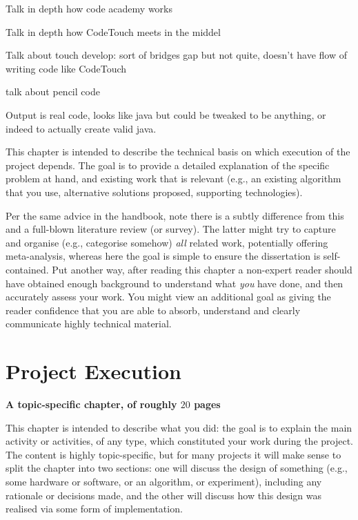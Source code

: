 \documentclass[ %
                    author={Jonathan Rankin},
                supervisor={Dr. David May, Dr. Ian Holyer},
                    degree={MEng},
                     title={CodeTouch},
                  subtitle={A Revolutionary Way To Program Real Code On Touch Screen Devices},
                      type={enterprise},
                      year={2015 } ]{dissertation}
\begin{document}
Talk in depth how code academy works

Talk in depth how CodeTouch meets in the middel

Talk about touch develop: sort of bridges gap but not quite, doesn't have flow of writing code like CodeTouch

talk about pencil code

Output is real code, looks like java but could be tweaked to be anything, or indeed to actually create valid java.

\noindent
This chapter is intended to describe the technical basis on which execution
of the project depends.  The goal is to provide a detailed explanation of
the specific problem at hand, and existing work that is relevant (e.g., an
existing algorithm that you use, alternative solutions proposed, supporting
technologies).  

Per the same advice in the handbook, note there is a subtly difference from
this and a full-blown literature review (or survey).  The latter might try
to capture and organise (e.g., categorise somehow) {\em all} related work,
potentially offering meta-analysis, whereas here the goal is simple to
ensure the dissertation is self-contained.  Put another way, after reading 
this chapter a non-expert reader should have obtained enough background to 
understand what {\em you} have done, and then accurately assess your work.
You might view an additional goal as giving the reader confidence that you 
are able to absorb, understand and clearly communicate highly technical 
material.


\chapter{Project Execution}
\label{chap:execution}

{\bf A topic-specific chapter, of roughly $20$ pages} 
\vspace{1cm} 

\noindent
This chapter is intended to describe what you did: the goal is to explain
the main activity or activities, of any type, which constituted your work 
during the project.  The content is highly topic-specific, but for many 
projects it will make sense to split the chapter into two sections: one 
will discuss the design of something (e.g., some hardware or software, or 
an algorithm, or experiment), including any rationale or decisions made, 
and the other will discuss how this design was realised via some form of 
implementation.  
\end{document}
